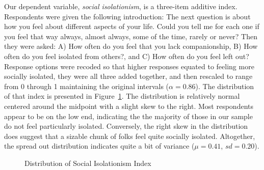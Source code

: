 \documentclass[
  letterpaper,
  DIV=11,
  numbers=noendperiod]{scrartcl}
\begin{document}
Our dependent variable, \emph{social isolationism}, is a three-item
additive index. Respondents were given the following introduction: The
next question is about how you feel about different aspects of your
life. Could you tell me for each one if you feel that way always, almost
always, some of the time, rarely or never? Then they were asked: A) How
often do you feel that you lack companionship, B) How often do you feel
isolated from others?, and C) How often do you feel left out? Response
options were recoded so that higher responses equated to feeling more
socially isolated, they were all three added together, and then rescaled
to range from 0 through 1 maintaining the original intervals
(\(\alpha = 0.86\)). The distribution of that index is presented in
Figure~\ref{fig-social-iso-dist}. The distribution is relatively normal
centered around the midpoint with a slight skew to the right. Most
respondents appear to be on the low end, indicating the the majority of
those in our sample do not feel particularly isolated. Conversely, the
right skew in the distribution does suggest that a sizable chunk of
folks feel quite socially isolated. Altogether, the spread out
distribution indicates quite a bit of variance (\(\mu = 0.41\),
\(sd = 0.20\)).

\begin{figure}


\caption{\label{fig-social-iso-dist}Distribution of Social Isolationism
Index}

\end{figure}%
\end{document}
